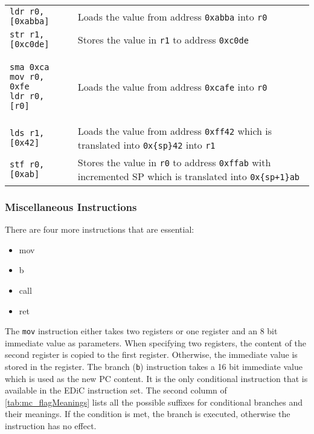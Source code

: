 \begin{tabular}{m{}m{}}
  \texttt{ldr r0, [0xabba]} & Loads the value from address \texttt{0xabba} into \texttt{r0}                                                                       \\
  \texttt{str r1, [0xc0de]} & Stores the value in \texttt{r1} to address \texttt{0xc0de}                                                                          \\
  \begin{verbatim}
sma 0xca
mov r0, 0xfe
ldr r0, [r0]
  \end{verbatim}
                                     & Loads the value from address \texttt{0xcafe} into \texttt{r0}                                                                       \\
  \texttt{lds r1, [0x42]}   & Loads the value from address \texttt{0xff42} which is translated into \texttt{0x\{sp\}42} into \texttt{r1}                         \\
  \texttt{stf r0, [0xab]}   & Stores the value in \texttt{r0} to address \texttt{0xffab} with incremented \gls{SP} which is translated into \texttt{0x\{sp+1\}ab} \\
\end{tabular}

\subsubsection{Miscellaneous Instructions}
There are four more instructions that are essential:

\begin{multicols}{4}
  \begin{itemize}
    \item mov
    \item b
    \item call
    \item ret
  \end{itemize}
\end{multicols}
The \texttt{mov} instruction either takes two registers or one register and an 8 bit immediate value as parameters.
When specifying two registers, the content of the second register is copied to the first register.
Otherwise, the immediate value is stored in the register.
The branch (\texttt{b}) instruction takes a 16 bit immediate value which is used as the new \gls{PC} content.
It is the only conditional instruction that is available in the \gls{EDiC} instruction set.
The second column of \cref{tab:mc_flagMeanings} lists all the possible suffixes for conditional branches and their meanings.
If the condition is met, the branch is executed, otherwise the instruction has no effect.

